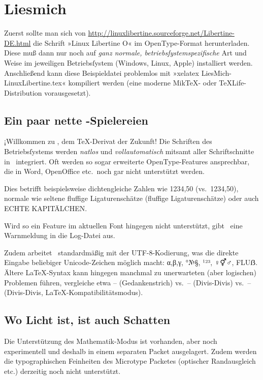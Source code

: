 ﻿\documentclass{scrartcl}
\begin{document}
\section*{Liesmich}
Zuerst sollte man sich von \url{http://linuxlibertine.sourceforge.net/Libertine-DE.html} die Schrift »Linux Libertine O« im OpenType-Format herunterladen. Diese muß dann nur noch auf \emph{ganz normale, betriebsſystemspezifische} Art und Weise im jeweiligen Betriebsſystem (Windows, Linux, Apple) installiert werden. Anschließend kann diese Beispieldatei problemlos mit »xelatex LiesMich-LinuxLibertine.tex« kompiliert werden (eine moderne Mik\TeX- oder \TeX Life-Distribution vorausgesetzt).


\subsection*{Ein paar nette \XeLaTeX-Spielereien}
¡Willkommen zu \XeLaTeX, dem \TeX-Derivat der Zukunft! Die Schriften des Betriebsſystems werden \emph{natlos} und \emph{vollautomatisch} mitsamt aller Schriftschnitte in \XeTeX\ integriert. Oft werden so sogar erweiterte OpenType-Features ansprechbar, die in Word, OpenOffice etc.\ noch gar nicht unterstützt werden.

Dies betrifft beispielsweise dichtengleiche Zahlen wie {1234,50} (vs.\ 1234,50), normale wie seltene {fluffige Ligaturenschätze} (fluffige Ligaturenschätze) oder auch {ECHTE KAPITÄLCHEN}.

Wird so ein Feature im aktuellen Font hingegen nicht unterstützt, gibt \XeTeX\ eine Warnmeldung in die Log-Datei aus.

Zudem arbeitet \XeLaTeX\ standardmäßig mit der UTF-8-Kodierung, was die direkte Eingabe beliebiger Unicode-Zeichen möglich macht: α,β,γ, °№§, ¹²³, ♀⚥♂, FLUẞ. Ältere \LaTeX-Syntax kann hingegen manchmal zu unerwarteten (aber logischen) Problemen führen, vergleiche etwa – (Gedankenstrich) vs.\ -- (Divis-Divis) vs.\ {-- (Divis-Divis, \LaTeX-Kompatibilitätsmodus)}.


\subsection*{Wo Licht ist, ist auch Schatten}
Die Unterstützung des Mathematik-Modus ist vorhanden, aber noch experimentell und deshalb in einem separaten Packet ausgelagert. Zudem werden die typographischen Feinheiten des Microtype Packetes (optischer Randausgleich etc.) derzeitig noch nicht unterstützt.



\end{document}
